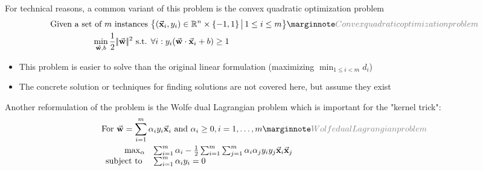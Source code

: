 For technical reasons, a common variant of this problem is the convex quadratic optimization problem
\begin{align*}\begin{aligned}
  \text{Given a set of } m \text{ instances }&\big\{ (\cv{x}_i, y_i) \in \mathbb{R}^n\times\{-1,1\} \,\big|\, 1\leq i\leq m \big\}\sidenote{Convex quadratic optimization problem}\\
  \min_{\cv{w}, b}\frac{1}{2}\norm{\cv{w}}^2 \text{ s.t. }& \forall i: y_i(\cv{w}\cdot\cv{x}_i + b) \geq 1
\end{aligned}\end{align*}
\begin{itemize}
  \item This problem is easier to solve than the original linear formulation (maximizing $\min_{1\leq i<m}d_i$)
  \item The concrete solution or techniques for finding solutions are not covered here, but assume they exist
\end{itemize}

Another reformulation of the problem is the Wolfe dual Lagrangian problem which is important for the "kernel trick":
\begin{align*}\begin{aligned}
  &\text{For } \cv{w}=\sum_{i=1}^m \alpha_i y_i \cv{x}_i \text{ and } \alpha_i\geq0, i=1,\dots,m \sidenote{Wolfe dual Lagrangian problem}\\
  & \begin{array}{rl}
      \max_\alpha & \sum_{i=1}^m \alpha_i - \frac{1}{2} \sum_{i=1}^m \sum_{j=1}^m \alpha_i \alpha_j y_i y_j \cv{x}_i\cv{x}_j\\
      \text{subject to } & \sum_{i=1}^m \alpha_i y_i = 0
  \end{array}
\end{aligned}\end{align*}

